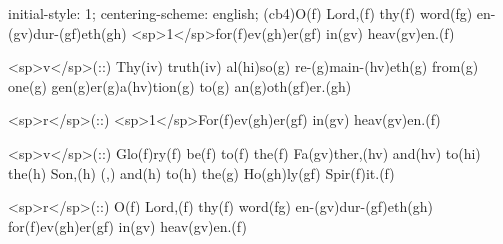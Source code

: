 initial-style: 1;
centering-scheme: english;
(cb4)O(f) Lord,(f) thy(f) word(fg) en-(gv)dur-(gf)eth(gh) <sp>1</sp>for(f)ev(gh)er(gf) in(gv) heav(gv)en.(f)

<sp>v</sp>(::) Thy(iv) truth(iv) al(hi)so(g) re-(g)main-(hv)eth(g) from(g) one(g) gen(g)er(g)a(hv)tion(g) to(g) an(g)oth(gf)er.(gh)

<sp>r</sp>(::) <sp>1</sp>For(f)ev(gh)er(gf) in(gv) heav(gv)en.(f)

<sp>v</sp>(::) Glo(f)ry(f) be(f) to(f) the(f) Fa(gv)ther,(hv) and(hv) to(hi) the(h) Son,(h) (,) and(h) to(h) the(g) Ho(gh)ly(gf) Spir(f)it.(f)

<sp>r</sp>(::) O(f) Lord,(f) thy(f) word(fg) en-(gv)dur-(gf)eth(gh) for(f)ev(gh)er(gf) in(gv) heav(gv)en.(f)